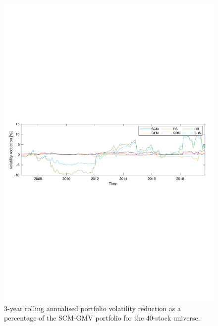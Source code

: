 \documentclass[a4paper,11pt,nocenter,bold,noupper,headcount]{mythesis}
\theoremstyle{plain}
\theoremstyle{definition}
\begin{document}
\begin{figure}[H]
\includegraphics[width=14.5cm]{n40_3_yr_roll_vol.pdf}
\caption{3-year rolling annualised portfolio volatility reduction as a percentage of the SCM-GMV portfolio for the 40-stock universe.}
\label{GMV_comp_40}
\end{figure}
\end{document}
